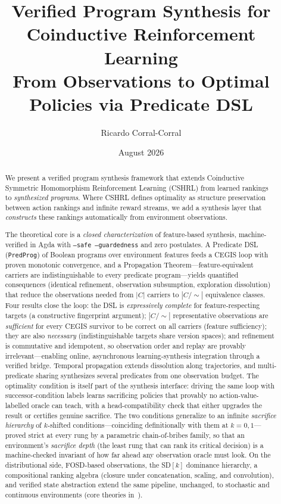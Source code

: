 \documentclass[9pt,a4paper]{article}
\title{\textbf{Verified Program Synthesis for Coinductive Reinforcement Learning} \\
From Observations to Optimal Policies via Predicate DSL}
\author{Ricardo Corral-Corral}
\date{August 2026}
\theoremstyle{plain}
\theoremstyle{definition}
\theoremstyle{remark}
\begin{document}
\maketitle

\begin{abstract}
We present a verified program synthesis framework that extends Coinductive Symmetric Homomorphism Reinforcement Learning (CSHRL) from learned rankings to \emph{synthesized programs}.
Where CSHRL defines optimality as structure preservation between action rankings and infinite reward streams, we add a synthesis layer that \emph{constructs} these rankings automatically from environment observations.

The theoretical core is a \emph{closed characterization} of feature-based synthesis, machine-verified in Agda with \texttt{--safe --guardedness} and zero postulates.  A Predicate DSL (\texttt{PredProg}) of Boolean programs over environment features feeds a CEGIS loop with proven monotonic convergence, and a Propagation Theorem---feature-equivalent carriers are indistinguishable to every predicate program---yields quantified consequences (identical refinement, observation subsumption, exploration dissolution) that reduce the observations needed from $|C|$ carriers to $|C/{\sim}|$ equivalence classes.  Four results close the loop: the DSL is \emph{expressively complete} for feature-respecting targets (a constructive fingerprint argument); $|C/{\sim}|$ representative observations are \emph{sufficient} for every CEGIS survivor to be correct on all carriers (feature sufficiency); they are also \emph{necessary} (indistinguishable targets share version spaces); and refinement is commutative and idempotent, so observation order and replay are provably irrelevant---enabling online, asynchronous learning-synthesis integration through a verified bridge.  Temporal propagation extends dissolution along trajectories, and multi-predicate sharing synthesizes several predicates from one observation budget.  The optimality condition is itself part of the synthesis interface: driving the same loop with successor-condition labels learns sacrificing policies that provably no action-value-labelled oracle can teach, with a head-compatibility check that either upgrades the result or certifies genuine sacrifice.  The two conditions generalize to an infinite \emph{sacrifice hierarchy} of $k$-shifted conditions---coinciding definitionally with them at $k = 0, 1$---proved strict at every rung by a parametric chain-of-bribes family, so that an environment's \emph{sacrifice depth} (the least rung that can rank its critical decision) is a machine-checked invariant of how far ahead any observation oracle must look.  On the distributional side, FOSD-based observations, the SD$[k]$ dominance hierarchy, a compositional ranking algebra (closure under concatenation, scaling, and convolution), and verified state abstraction extend the same pipeline, unchanged, to stochastic and continuous environments (core theories in~\cite{CSHRLSuccessor}).


\end{abstract}
\end{document}
